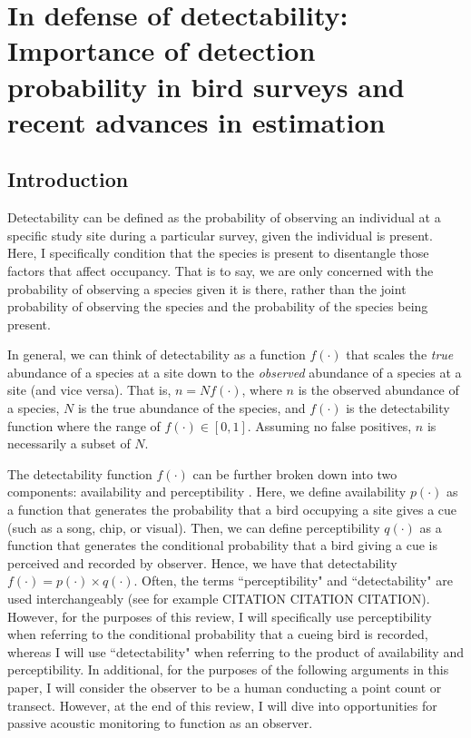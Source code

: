 \chapter{In defense of detectability: Importance of detection probability in bird surveys and recent advances in estimation}

\section{Introduction}

\par Detectability can be defined as the probability of observing an individual at a specific study site during a particular survey, given the individual is present.
Here, I specifically condition that the species is present to disentangle those factors that affect occupancy.
That is to say, we are only concerned with the probability of observing a species given it is there, rather than the joint probability of observing the species and the probability of the species being present.

\par In general, we can think of detectability as a function $f(\cdot)$ that scales the \textit{true} abundance of a species at a site down to the \textit{observed} abundance of a species at a site (and vice versa). 
That is, $n = Nf(\cdot)$, where $n$ is the observed abundance of a species, $N$ is the true abundance of the species, and $f(\cdot)$ is the detectability function where the range of $f(\cdot) \in [0,1]$.
Assuming no false positives, $n$ is necessarily a subset of $N$.

\par The detectability function $f(\cdot)$ can be further broken down into two components: availability and perceptibility \citep{marsh_correcting_1989}.
Here, we define availability $p(\cdot)$ as a function that generates the probability that a bird occupying a site gives a cue (such as a song, chip, or visual).
Then, we can define perceptibility $q(\cdot)$ as a function that generates the conditional probability that a bird giving a cue is perceived and recorded by observer.
Hence, we have that detectability $f(\cdot) = p(\cdot) \times q(\cdot)$.
Often, the terms ``perceptibility" and ``detectability" are used interchangeably (see for example CITATION CITATION CITATION).
However, for the purposes of this review, I will specifically use perceptibility when referring to the conditional probability that a cueing bird is recorded, whereas I will use ``detectability" when referring to the product of availability and perceptibility.
In additional, for the purposes of the following arguments in this paper, I will consider the observer to be a human conducting a point count or transect. However, at the end of this review, I will dive into opportunities for passive acoustic monitoring to function as an observer.

